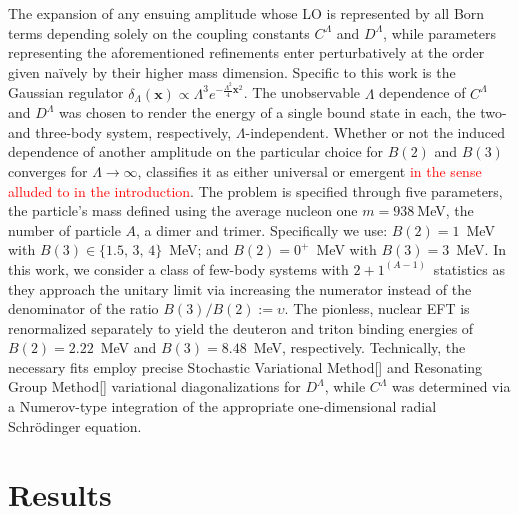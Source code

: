 \documentclass[preprint,12pt]{elsarticle}
\newcommand{\abb}{\ensuremath{2\!+\!1^{(A-1)}}}
\newcommand{\red}[1]{\textcolor{red}{#1}}
\newcommand{\lec}{C^\Lambda}
\newcommand{\led}{D^\Lambda}
\newcommand{\ve}[1]{\ensuremath{\boldsymbol{#1}}}
\begin{document}
The expansion of any ensuing amplitude whose LO is represented by all Born terms depending solely on the coupling constants $\lec$ and $\led$, while parameters representing the aforementioned refinements enter perturbatively at the order given na\"ively by their higher mass dimension. 
Specific to this work is the Gaussian regulator 
\mbox{$\delta_\Lambda(\ve{x}) \propto\Lambda^3 e^{-\frac{\Lambda^2}{4}\ve{x}^2}$}.
The unobservable $\Lambda$ dependence of $\lec$ and $\led$ was chosen to render the energy of a single bound state in each, the two- and three-body system, respectively, $\Lambda$-independent.
Whether or not the induced dependence of another amplitude on the particular choice for $B(2)$ and $B(3)$ converges for $\Lambda\to\infty$, classifies it as either universal or emergent \red{in the sense alluded to in the introduction}. %
The problem is specified through five parameters, the particle's mass defined using the average nucleon one $m=938~$MeV, the number of particle $A$, a dimer and trimer. 
Specifically we use: $B(2)=1$~MeV with $B(3)\in\lbrace1.5,\,3,\,4\rbrace$~MeV; and $B(2)=0^+$~MeV with $B(3)=3$~MeV.
In this work, we consider a class of few-body systems with \abb~statistics as they approach the unitary limit via increasing the numerator instead of the denominator of the ratio $B(3)/B(2):=\upsilon$.
The pionless, nuclear EFT is renormalized separately to yield the deuteron and triton binding energies of $B(2)=2.22$~MeV
and $B(3)=8.48$~MeV, respectively. 
Technically, the necessary fits employ precise Stochastic Variational Method[] and Resonating Group Method[] variational diagonalizations for $\led$, while $\lec$ was determined via a Numerov-type integration of the appropriate one-dimensional radial Schr\"odinger equation.



\section{Results}
\end{document}

